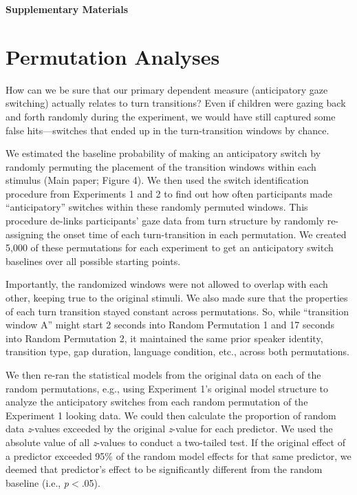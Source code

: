 \documentclass[authoryear, 12pt]{elsarticle}
\begin{document}
\begin{center}
\Large
\textbf{Supplementary Materials}
\end{center}

\appendix
\renewcommand{\appendixname}{Material}

\section{Permutation Analyses}
\label{sec:permutation}
\setcounter{figure}{0}
\setcounter{table}{0}
\normalsize
How can we be sure that our primary dependent measure (anticipatory gaze switching) actually relates to turn transitions? Even if children were gazing back and forth randomly during the experiment, we would have still captured some false hits---switches that ended up in the turn-transition windows by chance.

We estimated the baseline probability of making an anticipatory switch by randomly permuting the placement of the transition windows within each stimulus (Main paper; Figure 4). We then used the switch identification procedure from Experiments 1 and 2 to find out how often participants made ``anticipatory'' switches within these randomly permuted windows. This procedure de-links participants' gaze data from turn structure by randomly re-assigning the onset time of each turn-transition in each permutation. We created 5,000 of these permutations for each experiment to get an anticipatory switch baselines over all possible starting points.

Importantly, the randomized windows were not allowed to overlap with each other, keeping true to the original stimuli. We also made sure that the properties of each turn transition stayed constant across permutations. So, while ``transition window A'' might start 2 seconds into Random Permutation 1 and 17 seconds into Random Permutation 2, it maintained the same prior speaker identity, transition type, gap duration, language condition, etc., across both permutations.

We then re-ran the statistical models from the original data on each of the random permutations, e.g., using Experiment 1's original model structure to analyze the anticipatory switches from each random permutation of the Experiment 1 looking data. We could then calculate the proportion of random data \textit{z}-values exceeded by the original \textit{z}-value for each predictor. We used the absolute value of all \textit{z}-values to conduct a two-tailed test. If the original effect of a predictor exceeded 95\% of the random model effects for that same predictor, we deemed that predictor's effect to be significantly different from the random baseline (i.e., \textit{p}$<$.05).
\end{document}
